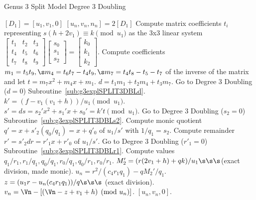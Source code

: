 \begin{algorithm}
\caption{Genus 3 Split Model Degree 3 Doubling\label{alg:g3explSPLIT3DBL}}
\begin{algorithmic} [1]
\Require $[D_1]= [u_1, v_1,0]$ \smallskip
\Ensure $[u_n,v_n,n_n] = 2[D_1]$
\algrule
\State Compute matrix coefficients $t_i$ representing $s(h + 2v_1)\equiv k \pmod{u_1}$ as the 3x3 linear system $ \left[
\begin{smallmatrix} t_1 & t_2 & t_3\\ t_4 & t_5 & t_6\\ t_7 &t_8 & t_9 \end{smallmatrix}\right] \left[
\begin{smallmatrix} s_0\\ s_1 \\s_2 \end{smallmatrix} \right] = \left[ \begin{smallmatrix} k_0\\ k_1\\ k_2 \end{smallmatrix} \right]$.
\State Compute coefficients $m_1 = t_5t_9, \s m_4 = t_6t_7 - t_4t_9, \s m_7 = t_4t_8 - t_5-t_7$ of the inverse of the matrix and let $t = m_7x^2 + m_4x + m_1$.
\State $d = t_1m_1 + t_2m_4 + t_3m_7$.
\State Go to Degree 3 Doubling ($d=0$) Subroutine~\ref{sub:g3explSPLIT3DBLd}.
\EndIf
\State $k' = (f - v_1(v_1 + h))/u_1 \pmod{u_1}$.
\State $s' = ds = s_2'x^2 + s_1'x + s_0' =  k't \pmod{u_1}$.
\State Go to Degree 3 Doubling ($s_2=0$) Subroutine~\ref{sub:g3explSPLIT3DBLs2}.
\EndIf
\State Compute monic quotient $q'= x + s'_2(q_0/q_1) = x + q'_0$ of $u_1/s'$ with $1/q_1 = s_2$. 
\State Compute remainder $r' = s'_2dr = r'_1x + r'_0$ of $u_1/s'$.
\State Go to Degree 3 Doubling ($r'_1=0$) Subroutine~\ref{sub:g3explSPLIT3DBLr1}.
\EndIf
\State Compute values $q_1/r_1, r_1/q_1, q_0/q_1, r_0/q_1, q_0/r_1, r_0/r_1$.
\State $M_2' = (r(2v_1 + h) + qk)/u_1 \s\s\s $(exact division, made monic).
\State $u_n = r^2/(c_4r_1q_1) - qM_2'/q_1.$
\State $z = (u_1r - u_n(c_4r_1q_1))/q \s\s\s$ (exact division).
\State $v_n = \Vn - [(\Vn - z + v_1 + h) \pmod{u_n}]$.
\State \Return $[u_n,v_n,0]$.
\end{algorithmic}
\end{algorithm}

